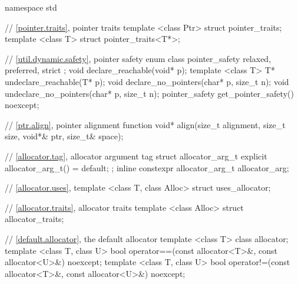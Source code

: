 %
%
\begin{codeblock}
namespace std {
  // \ref{pointer.traits}, pointer traits
  template <class Ptr> struct pointer_traits;
  template <class T> struct pointer_traits<T*>;

  // \ref{util.dynamic.safety}, pointer safety
  enum class pointer_safety { relaxed, preferred, strict };
  void declare_reachable(void* p);
  template <class T> T* undeclare_reachable(T* p);
  void declare_no_pointers(char* p, size_t n);
  void undeclare_no_pointers(char* p, size_t n);
  pointer_safety get_pointer_safety() noexcept;

  // \ref{ptr.align}, pointer alignment function
  void* align(size_t alignment, size_t size, void*& ptr, size_t& space);

  // \ref{allocator.tag}, allocator argument tag
  struct allocator_arg_t { explicit allocator_arg_t() = default; };
  inline constexpr allocator_arg_t allocator_arg{};

  // \ref{allocator.uses}, 
  template <class T, class Alloc> struct uses_allocator;

  // \ref{allocator.traits}, allocator traits
  template <class Alloc> struct allocator_traits;

  // \ref{default.allocator}, the default allocator
  template <class T> class allocator;
  template <class T, class U>
    bool operator==(const allocator<T>&, const allocator<U>&) noexcept;
  template <class T, class U>
    bool operator!=(const allocator<T>&, const allocator<U>&) noexcept;

}
\end{codeblock}
